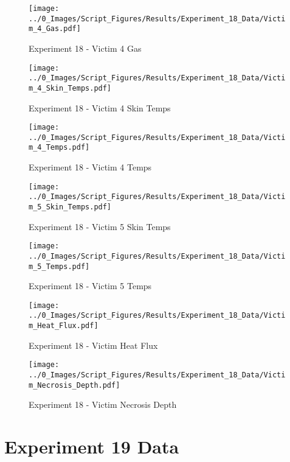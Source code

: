 	\clearpage

	\begin{figure}[H]
		\centering
		\texttt{[image: ../0\_Images/Script\_Figures/Results/Experiment\_18\_Data/Victim\_4\_Gas.pdf]}
		\caption[]{Experiment 18 - Victim 4 Gas}
	\end{figure}
 

	\begin{figure}[H]
		\centering
		\texttt{[image: ../0\_Images/Script\_Figures/Results/Experiment\_18\_Data/Victim\_4\_Skin\_Temps.pdf]}
		\caption[]{Experiment 18 - Victim 4 Skin Temps}
	\end{figure}
 
	\clearpage

	\begin{figure}[H]
		\centering
		\texttt{[image: ../0\_Images/Script\_Figures/Results/Experiment\_18\_Data/Victim\_4\_Temps.pdf]}
		\caption[]{Experiment 18 - Victim 4 Temps}
	\end{figure}
 

	\begin{figure}[H]
		\centering
		\texttt{[image: ../0\_Images/Script\_Figures/Results/Experiment\_18\_Data/Victim\_5\_Skin\_Temps.pdf]}
		\caption[]{Experiment 18 - Victim 5 Skin Temps}
	\end{figure}
 
	\clearpage

	\begin{figure}[H]
		\centering
		\texttt{[image: ../0\_Images/Script\_Figures/Results/Experiment\_18\_Data/Victim\_5\_Temps.pdf]}
		\caption[]{Experiment 18 - Victim 5 Temps}
	\end{figure}
 

	\begin{figure}[H]
		\centering
		\texttt{[image: ../0\_Images/Script\_Figures/Results/Experiment\_18\_Data/Victim\_Heat\_Flux.pdf]}
		\caption[]{Experiment 18 - Victim Heat Flux}
	\end{figure}
 
	\clearpage

	\begin{figure}[H]
		\centering
		\texttt{[image: ../0\_Images/Script\_Figures/Results/Experiment\_18\_Data/Victim\_Necrosis\_Depth.pdf]}
		\caption[]{Experiment 18 - Victim Necrosis Depth}
	\end{figure}
 

\clearpage		\large
\section{Experiment 19 Data} \label{App:Exp19Results} 

